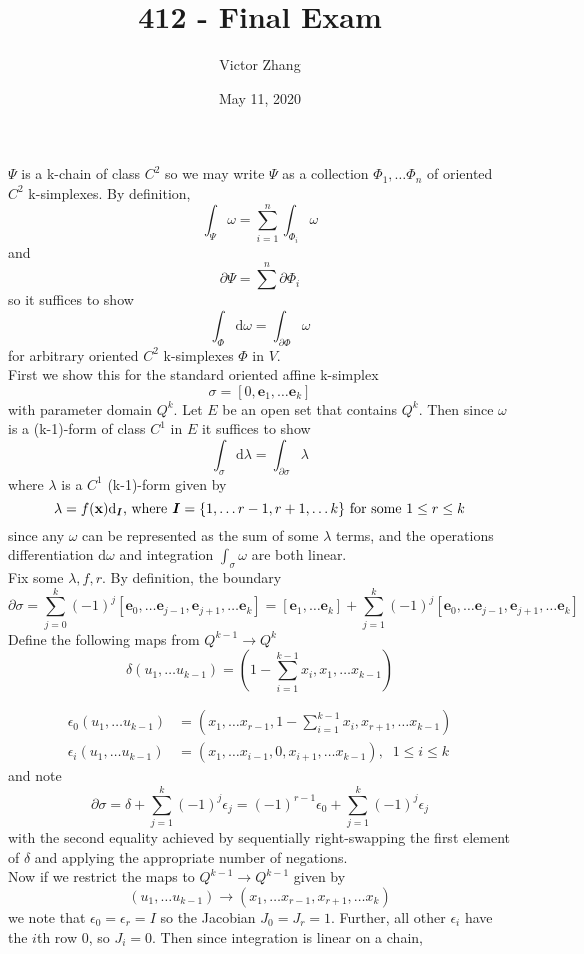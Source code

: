 \documentclass{article}
\title{412 - Final Exam}
\author{Victor Zhang}
\date{May 11, 2020}
\begin{document}
\maketitle

$\Psi$ is a k-chain of class $C^2$ so we may write $\Psi$ as a collection $\Phi_1, \dots \Phi_n$ of oriented $C^2$ k-simplexes. By definition,
$$\int_\Psi \omega = \sum^n_{i=1} \int_{\Phi_i} \omega$$
and
$$\partial \Psi = \sum^n \partial \Phi_i$$
so it suffices to show
$$\int_\Phi \textrm{d}\omega = \int_{\partial\Phi}\omega$$
for arbitrary oriented $C^2$ k-simplexes $\Phi$ in $V$.\\
First we show this for the standard oriented affine k-simplex
$$\sigma = [0,\textbf{e}_1,\dots \textbf{e}_k]$$
with parameter domain $Q^k$. Let $E$ be an open set that contains $Q^k$. Then since $\omega$ is a (k-1)-form of class $C^1$ in $E$ it suffices to show
$$\int_\sigma \textrm{d}\lambda = \int_{\partial\sigma}\lambda$$
where $\lambda$ is a $C^1$ (k-1)-form given by
$$\lambda = f(\textbf{x})\textrm{d}_{\textbf{\textit{I}}} \textrm{, where } \textbf{\textit{I}} = \{1,\dots r-1,r+1,\dots k\} \textrm{ for some } 1\leq r \leq k$$
since any $\omega$ can be represented as the sum of some $\lambda$ terms, and the operations differentiation $\textrm{d}\omega$ and integration $\int_\sigma \omega$ are both linear.\\
Fix some $\lambda, f, r$. By definition, the boundary
$$\partial\sigma = \sum^k_{j=0} (-1)^j[\textbf{e}_0, \dots \textbf{e}_{j-1}, \textbf{e}_{j+1}, \dots \textbf{e}_k] = [\textbf{e}_1, \dots \textbf{e}_k] + \sum_{j=1}^k (-1)^j[\textbf{e}_0, \dots \textbf{e}_{j-1}, \textbf{e}_{j+1}, \dots \textbf{e}_k]$$
Define the following maps from $Q^{k-1} \to Q^k$
\begin{equation*}
    \delta (u_1,\dots u_{k-1}) = (1-\sum^{k-1}_{i=1} x_i, x_1, \dots x_{k-1})
\end{equation*}

\begin{equation}
\begin{split}
    \epsilon_0 (u_1,\dots u_{k-1}) &= (x_1, \dots x_{r-1}, 1-\sum^{k-1}_{i=1} x_i, x_{r+1}, \dots x_{k-1}) \\
    \epsilon_i (u_1,\dots u_{k-1}) &= (x_1, \dots x_{i-1}, 0, x_{i+1}, \dots x_{k-1}), \; \; 1\leq i\leq k
\end{split}
\end{equation}
and note
$$\partial \sigma = \delta + \sum_{j=1}^k(-1)^j\epsilon_j = (-1)^{r-1}\epsilon_0 + \sum_{j=1}^k(-1)^j\epsilon_j$$
with the second equality achieved by sequentially right-swapping the first element of $\delta$ and applying the appropriate number of negations.\\
Now if we restrict the maps to $Q^{k-1} \to Q^{k-1}$ given by
$$(u_1,\dots u_{k-1}) \to (x_1,\dots x_{r-1},x_{r+1},\dots x_k)$$
we note that $\epsilon_0 = \epsilon_r = I$ so the Jacobian $J_0 = J_r = 1$. Further, all other $\epsilon_i$ have the $i$th row 0, so $J_i = 0$. Then since integration is linear on a chain,
\end{document}
